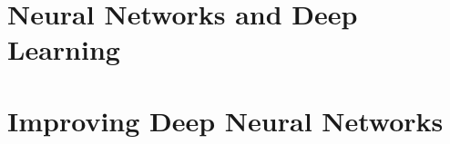 \documentclass[a4paper,12pt,hidelinks]{book}
\begin{document}
\tableofcontents

\part{Neural Networks and Deep Learning}


\part{Improving Deep Neural Networks}



\end{document}
